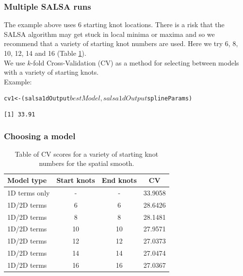 \begin{frame}[fragile]
\frametitle{Multiple SALSA runs}

\noindent The example above uses 6 starting knot locations.  There is a risk that the SALSA algorithm may get stuck in local minima or maxima and so we recommend that a variety of starting knot numbers are used.  Here we try 6, 8, 10, 12, 14 and 16 (Table \ref{tab:nsfitstats}).  \\

\noindent We use $k$-fold Cross-Validation (CV) as a method for selecting between models with a variety of starting knots.\\

Example:
\begin{knitrout}\footnotesize
{}\color{fgcolor}
\end{knitrout}


\begin{knitrout}\footnotesize
{}\color{fgcolor}\begin{kframe}
\begin{alltt}
cv1 <- (salsa1dOutput$bestModel, salsa1dOutput$splineParams)
\end{alltt}
\begin{verbatim}
[1] 33.91
\end{verbatim}
\end{kframe}
\end{knitrout}

\end{frame}

\begin{frame}[fragile]
\frametitle{Choosing a model}
\begin{table}[h]
\caption{Table of CV scores for a variety of starting knot numbers for the spatial smooth.}
\centering
\begin{tabular}{l|c|c|c}
\textbf{Model type} & \textbf{Start knots} & \textbf{End knots}  & \textbf{CV}\\
\hline
1D terms only & - & - & 33.9058\\
1D/2D terms & 6 & 6  & 28.6426\\
1D/2D terms & 8 & 8  & 28.1481\\
1D/2D terms & 10 & 10  & 27.9571\\
1D/2D terms & 12 & 12  & 27.0373\\
1D/2D terms & 14 & 14  & 27.0474\\
1D/2D terms & 16 & 16  & 27.0367\\
\end{tabular}
\label{tab:nsfitstats}
\end{table}
\end{frame}


